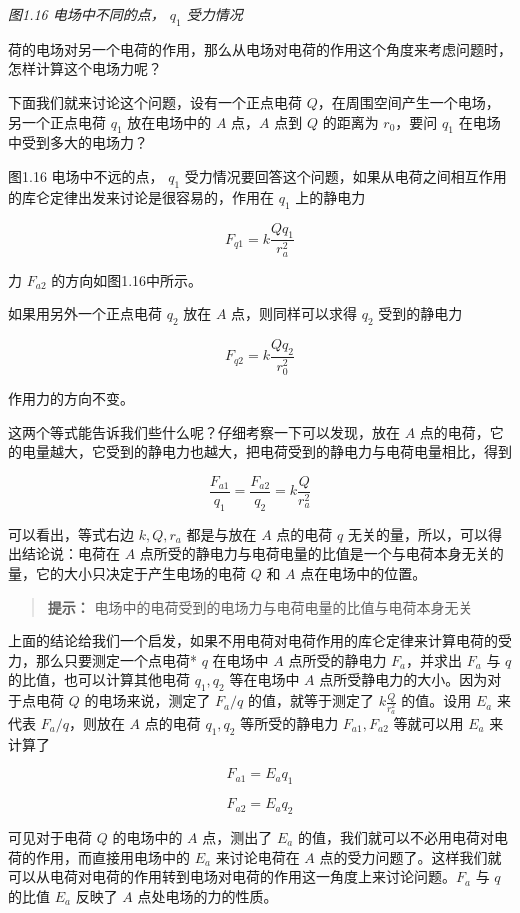 \emph{图1.16 电场中不同的点， \(q_{1}\) 受力情况}

荷的电场对另一个电荷的作用，那么从电场对电荷的作用这个角度来考虑问题时，怎样计算这个电场力呢？

下面我们就来讨论这个问题，设有一个正点电荷
\(Q\)，在周围空间产生一个电场，另一个正点电荷 \(q_{1}\) 放在电场中的
\(A\) 点，\(A\) 点到 \(Q\) 的距离为 \(r_{0}\)，要问 \(q_{1}\)
在电场中受到多大的电场力？

图1.16 电场中不远的点， \(q_{1}\)
受力情况要回答这个问题，如果从电荷之间相互作用的库仑定律出发来讨论是很容易的，作用在
\(q_{1}\) 上的静电力

\[
F_{q 1} = k \frac{Q q_{1}}{r_{a}^{2}}
\]

力 \(F_{a2}\) 的方向如图1.16中所示。

如果用另外一个正点电荷 \(q_{2}\) 放在 \(A\) 点，则同样可以求得 \(q_{2}\)
受到的静电力

\[
F_{q 2} = k \frac{Q q_{2}}{r_{0}^{2}}
\]

作用力的方向不变。

这两个等式能告诉我们些什么呢？仔细考察一下可以发现，放在 \(A\)
点的电荷，它的电量越大，它受到的静电力也越大，把电荷受到的静电力与电荷电量相比，得到

\[
\frac{F_{a 1}}{q_{1}} = \frac{F_{a 2}}{q_{2}} = k \frac{Q}{r_{a}^{2}}
\]

可以看出，等式右边 \(k, Q, r_{a}\) 都是与放在 \(A\) 点的电荷 \(q\)
无关的量，所以，可以得出结论说：电荷在 \(A\)
点所受的静电力与电荷电量的比值是一个与电荷本身无关的量，它的大小只决定于产生电场的电荷
\(Q\) 和 \(A\) 点在电场中的位置。

\begin{quote}
\textbf{提示：} 电场中的电荷受到的电场力与电荷电量的比值与电荷本身无关
\end{quote}

上面的结论给我们一个启发，如果不用电荷对电荷作用的库仑定律来计算电荷的受力，那么只要测定一个点电荷*
\(q\) 在电场中 \(A\) 点所受的静电力 \(F_{a}\)，并求出 \(F_{a}\) 与 \(q\)
的比值，也可以计算其他电荷 \(q_{1}, q_{2}\) 等在电场中 \(A\)
点所受静电力的大小。因为对于点电荷 \(Q\) 的电场来说，测定了 \(F_{a}/q\)
的值，就等于测定了 \(k \frac{Q}{r_{a}^{2}}\) 的值。设用 \(E_{a}\) 来代表
\(F_{a}/q\)，则放在 \(A\) 点的电荷 \(q_{1}, q_{2}\) 等所受的静电力
\(F_{a1}, F_{a2}\) 等就可以用 \(E_{a}\) 来计算了

\[
F_{a 1} = E_{a} q_{1}
\]

\[
F_{a 2} = E_{a} q_{2}
\]

可见对于电荷 \(Q\) 的电场中的 \(A\) 点，测出了 \(E_{a}\)
的值，我们就可以不必用电荷对电荷的作用，而直接用电场中的 \(E_{a}\)
来讨论电荷在 \(A\)
点的受力问题了。这样我们就可以从电荷对电荷的作用转到电场对电荷的作用这一角度上来讨论问题。\(F_{a}\)
与 \(q\) 的比值 \(E_{a}\) 反映了 \(A\) 点处电场的力的性质。

